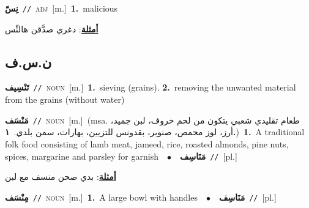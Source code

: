 \documentclass[10pt,a4paper,twoside]{article} %
\begin{document}
\begin{multicols}{2}
{\setlength\topsep{0pt}\textbf{\foreignlanguage{arabic}{نِسّ}}\ {\color{gray}\texttt{//}\color{black}}\ \textsc{adj}\ [m.]\ \textbf{1.}~malicious\  \begin{flushright}\color{gray}\foreignlanguage{arabic}{\textbf{\underline{\foreignlanguage{arabic}{أمثلة}}}: دغري صدَّقن هالنِّس}\end{flushright}\color{black}} \vspace{2mm}

\vspace{-3mm}
\subsection*{\color{blue}\foreignlanguage{arabic}{ن.س.ف}\color{blue}{}} 

{\setlength\topsep{0pt}\textbf{\foreignlanguage{arabic}{تَنْسِيف}}\ {\color{gray}\texttt{//}\color{black}}\ \textsc{noun}\ [m.]\ \textbf{1.}~sieving (grains).  \textbf{2.}~removing the unwanted material from the grains (without water)\ } \vspace{2mm}

{\setlength\topsep{0pt}\textbf{\foreignlanguage{arabic}{مَنْسَف}}\ {\color{gray}\texttt{//}\color{black}}\ \textsc{noun}\ [m.]\ \color{gray}(msa. \foreignlanguage{arabic}{طعام تقليدي شعبي يتكون من لحم خروف، لبن جميد، أرز، لوز محمص، صنوبر، بقدونس للتزيين، بهارات، سمن بلدي.}~\foreignlanguage{arabic}{\textbf{١.}})\color{black}\ \textbf{1.}~A traditional folk food consisting of lamb meat, jameed, rice, roasted almonds, pine nuts, spices, margarine and parsley for garnish\ \ $\bullet$\ \ \setlength\topsep{0pt}\textbf{\foreignlanguage{arabic}{مَنَاسِف}}\ {\color{gray}\texttt{//}\color{black}}\ [pl.]\  \begin{flushright}\color{gray}\foreignlanguage{arabic}{\textbf{\underline{\foreignlanguage{arabic}{أمثلة}}}: بدي صحن منسف مع لبن}\end{flushright}\color{black}} \vspace{2mm}

{\setlength\topsep{0pt}\textbf{\foreignlanguage{arabic}{مِنْسَف}}\ {\color{gray}\texttt{//}\color{black}}\ \textsc{noun}\ [m.]\ \textbf{1.}~A large bowl with handles\ \ $\bullet$\ \ \setlength\topsep{0pt}\textbf{\foreignlanguage{arabic}{مَنَاسِف}}\ {\color{gray}\texttt{//}\color{black}}\ [pl.]\ } \vspace{2mm}


\end{multicols}
\end{document}
